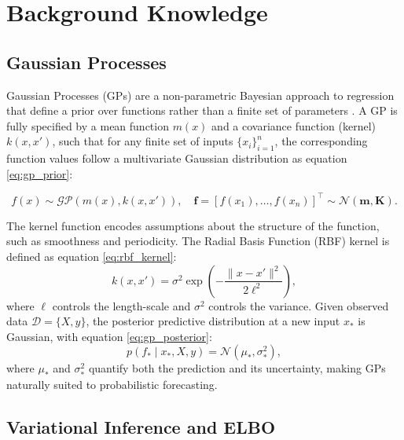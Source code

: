 \section{Background Knowledge}
\label{sec:background}

\subsection{Gaussian Processes}

Gaussian Processes (GPs) are a non-parametric Bayesian approach to regression that define a prior over functions rather than a finite set of parameters \parencite{10.7551/mitpress/3206.001.0001}. A GP is fully specified by a mean function $m(x)$ and a covariance function (kernel) $k(x, x')$, such that for any finite set of inputs $\{x_i\}_{i=1}^n$, the corresponding function values follow a multivariate Gaussian distribution as equation \ref{eq:gp_prior}:

\begin{equation}
f(x) \sim \mathcal{GP}(m(x), k(x, x')), \quad
\mathbf{f} = [f(x_1), \dots, f(x_n)]^\top \sim \mathcal{N}(\mathbf{m}, \mathbf{K}).
\label{eq:gp_prior}
\end{equation}

The kernel function encodes assumptions about the structure of the function, such as smoothness and periodicity. The Radial Basis Function (RBF) kernel is defined as equation \ref{eq:rbf_kernel}:
\begin{equation}
k(x, x') = \sigma^2 \exp\left(-\frac{\|x - x'\|^2}{2\ell^2}\right),
\label{eq:rbf_kernel}
\end{equation}
where $\ell$ controls the length-scale and $\sigma^2$ controls the variance. Given observed data $\mathcal{D} = \{X, y\}$, the posterior predictive distribution at a new input $x_*$ is Gaussian, with equation \ref{eq:gp_posterior}:
\begin{equation}
p(f_* \mid x_*, X, y) = \mathcal{N}(\mu_*, \sigma_*^2),
\label{eq:gp_posterior}
\end{equation}
where $\mu_*$ and $\sigma_*^2$ quantify both the prediction and its uncertainty, making GPs naturally suited to probabilistic forecasting.

\subsection{Variational Inference and ELBO}

